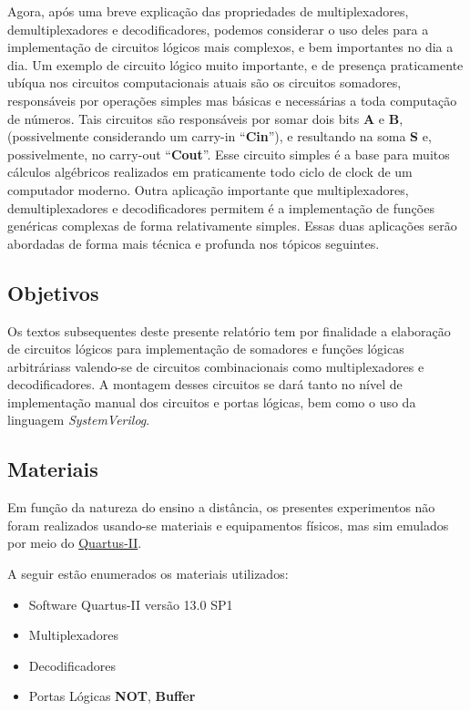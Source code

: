 \documentclass[12pt]{article}
\begin{document}
Agora, após uma breve explicação das propriedades de multiplexadores,
demultiplexadores e decodificadores, podemos considerar o uso deles para a
implementação de circuitos lógicos mais complexos, e bem importantes no dia a
dia. Um exemplo de circuito lógico muito importante, e de presença praticamente
ubíqua nos circuitos computacionais atuais são os circuitos somadores,
responsáveis por operações simples mas básicas e necessárias a toda computação
de números. Tais circuitos são responsáveis por somar dois bits \textbf{A} e
\textbf{B}, (possivelmente considerando um carry-in ``\textbf{Cin}''), e
resultando na soma \textbf{S} e, possivelmente, no carry-out ``\textbf{Cout}''.
Esse circuito simples é a base para muitos cálculos algébricos realizados em
praticamente todo ciclo de clock de um computador moderno. Outra aplicação
importante que multiplexadores, demultiplexadores e decodificadores permitem é a
implementação de funções genéricas complexas de forma relativamente simples.
Essas duas aplicações serão abordadas de forma mais técnica e profunda nos
tópicos seguintes.


\subsection{Objetivos}\label{sec:Objetivos}

Os textos subsequentes deste presente relatório tem por finalidade a elaboração
de circuitos lógicos para implementação de somadores e funções lógicas
arbitráriass valendo-se de circuitos combinacionais como multiplexadores e
decodificadores. A montagem desses circuitos se dará tanto no nível de
implementação manual dos circuitos e portas lógicas, bem como o uso da linguagem
\emph{SystemVerilog}.


\subsection{Materiais}
\label{sec:Materiais}
Em função da natureza do ensino a distância, os presentes experimentos não foram
realizados usando-se materiais e equipamentos físicos, mas sim emulados por meio
do
\href{https://www.intel.com/content/www/us/en/software/programmable/quartus-prime/download.html}{Quartus-II}.

A seguir estão enumerados os materiais utilizados:
\begin{itemize}
    \item Software Quartus-II versão 13.0 SP1
    \item Multiplexadores
    \item Decodificadores
    \item Portas Lógicas \textbf{NOT}, \textbf{Buffer}
\end{itemize}
\end{document}
